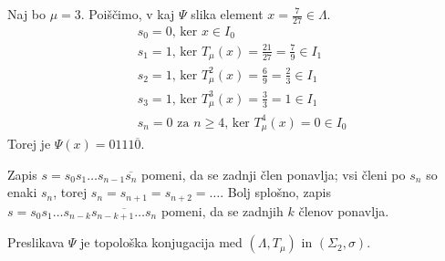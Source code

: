 \documentclass{isrmdelo}
\begin{document}
\begin{zgled}
\label{zgled:pot}
Naj bo $\mu = 3$. Poiščimo, v kaj $\Psi$ slika element $x = \frac{7}{27} \in \Lambda$.
\begin{align*}
    &s_0 = 0 \text{, ker } x \in I_0 \\
    &s_1 = 1 \text{, ker } T_{\mu}(x) = \tfrac{21}{27} = \tfrac{7}{9} \in I_1 \\
    &s_2 = 1 \text{, ker } T_{\mu}^2(x) = \tfrac{6}{9} = \tfrac{2}{3} \in I_1 \\
    &s_3 = 1 \text{, ker } T_{\mu}^3(x) = \tfrac{3}{3} = 1 \in I_1 \\
    &s_n = 0 \text{ za } n \geq 4 \text{, ker } T_{\mu}^4(x) = 0 \in I_0
\end{align*}
Torej je $\Psi(x) = 0111\overline{0}$.
\end{zgled}

\begin{opomba}
Zapis $s = s_0 s_1 \ldots s_{n-1} \overline{s_n}$ pomeni, da se zadnji člen ponavlja; vsi členi po $s_n$ so enaki $s_n$, torej $s_n = s_{n+1} = s_{n+2} = \dots$. Bolj splošno, zapis $s = s_0 s_1 \ldots s_{n-k} \overline{s_{n-k+1} \ldots s_{n}}$ pomeni, da se zadnjih $k$ členov ponavlja.
\end{opomba}

\bigskip

\begin{izrek}
Preslikava $\Psi$ je topološka konjugacija med $(\Lambda, T_{\mu})$ in $(\Sigma_2, \sigma)$.
\end{izrek}
\end{document}
